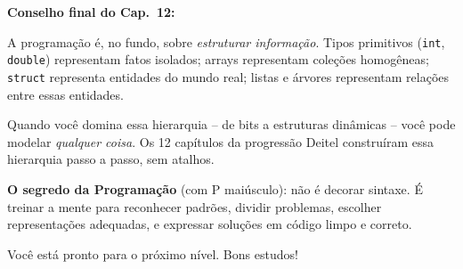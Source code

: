 \documentclass[12pt,a4paper]{article}
\begin{document}
\bigskip

\begin{boaprática}
\textbf{Conselho final do Cap.~12:}

A programação é, no fundo, sobre \textit{estruturar informação}. Tipos
primitivos (\texttt{int}, \texttt{double}) representam fatos isolados;
arrays representam coleções homogêneas; \texttt{struct} representa entidades
do mundo real; listas e árvores representam relações entre essas entidades.

Quando você domina essa hierarquia -- de bits a estruturas dinâmicas -- você
pode modelar \textit{qualquer coisa}. Os 12 capítulos da progressão Deitel
construíram essa hierarquia passo a passo, sem atalhos.

\textbf{O segredo da Programação} (com P maiúsculo): não é decorar sintaxe.
É treinar a mente para reconhecer padrões, dividir problemas, escolher
representações adequadas, e expressar soluções em código limpo e correto.

Você está pronto para o próximo nível. Bons estudos!
\end{boaprática}
\end{document}
